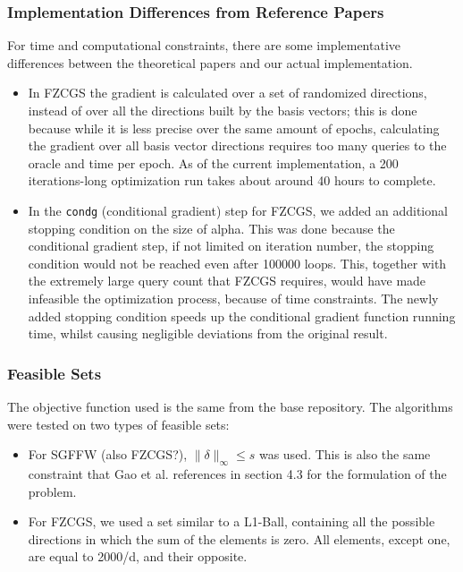 \documentclass[10pt,twocolumn,letterpaper]{article}
\begin{document}
\subsubsection{Implementation Differences from Reference Papers}

For time and computational constraints, there are some implementative differences 
between the theoretical papers and our actual implementation.

\begin{itemize}
   \item In FZCGS the gradient is calculated over a set of 
   randomized directions, instead of over all 
   the directions built by the basis vectors; this is done because 
   while it is less precise over the same amount of epochs, 
   calculating the gradient over all basis vector directions 
   requires too many queries to the oracle and time per epoch.
   As of the current implementation, a 200 iterations-long 
   optimization run takes about around 40 hours to complete.

   \item In the \texttt{condg} (conditional gradient) step for FZCGS,
   we added an additional stopping condition on the size of alpha.
   This was done because the conditional gradient step, if not limited
   on iteration number, the stopping condition would not be reached even
   after 100000 loops. This, together with the extremely large query count
   that FZCGS requires, would have made infeasible the optimization process,
   because of time constraints. The newly added stopping condition speeds up
   the conditional gradient function running time, whilst causing negligible
   deviations from the original result.
\end{itemize}

\subsubsection{Feasible Sets}

The objective function used is the same from the base repository.
The algorithms were tested on two types of feasible sets:

\begin{itemize}
   \item For SGFFW (also FZCGS?), $\|\delta\|_{\infty} \leq s$ was used. This is 
   also the same constraint that Gao et al. references in section 4.3 for the formulation
   of the problem.
   \item For FZCGS, we used a set similar to a L1-Ball,  containing
   all the possible directions in which the sum of the elements is zero. All elements, except
   one, are equal to 2000/d, and their opposite.
\end{itemize}
\end{document}
